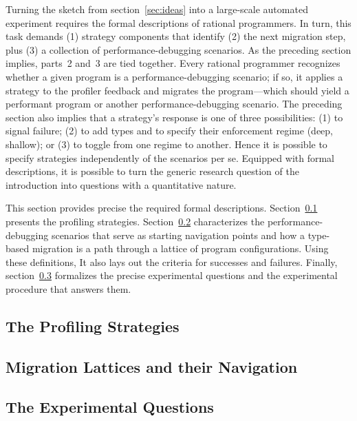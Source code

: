 
Turning the sketch from section~\ref{sec:ideas} into a large-scale automated
experiment requires the formal descriptions of rational programmers. In turn,
this task demands (1) strategy components that identify (2) the next migration
step, plus (3) a collection of performance-debugging scenarios. As the preceding
section implies, parts~2 and~3 are tied together. Every rational programmer
recognizes whether a given program is a performance-debugging scenario; if so,
it applies a strategy to the profiler feedback and migrates the program---which
should yield a performant program or another performance-debugging scenario.
The preceding section also implies that a strategy's response is one of three
possibilities: (1) to signal failure; (2) to add types and to specify their
enforcement regime (deep, shallow); or (3) to toggle from one regime to
another. Hence it is possible to specify strategies independently of the
scenarios per se. Equipped with formal descriptions, it is possible to turn the
generic research question of the introduction into questions with a quantitative
nature.

This section provides precise the required formal descriptions.
Section~\ref{subsec:strategies} presents the profiling strategies.
Section~\ref{subsec:lattice} characterizes the performance-debugging scenarios
that serve as starting navigation points and how a type-based migration is a
path through a lattice of program configurations. Using these definitions, It
also lays out the criteria for successes and failures. Finally,
section~\ref{subsec:questions} formalizes the precise experimental questions and
the experimental procedure that answers them.


\def\exp#1#2{\subsection{#2} \label{subsec:#1} }

\exp{strategies}{The Profiling Strategies}
\exp{lattice}{Migration Lattices and their Navigation}
\exp{questions}{The Experimental Questions}
